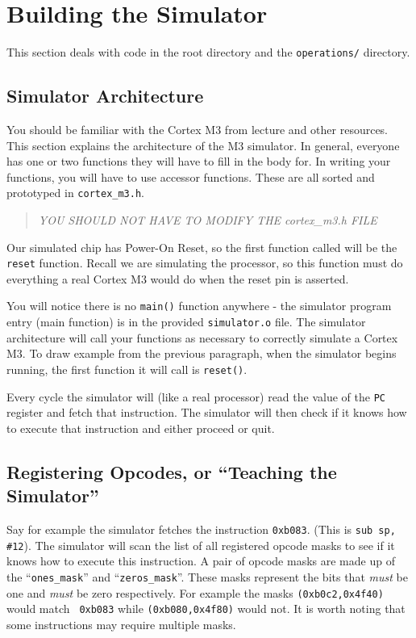 \documentclass{article}
\begin{document}
\section{Building the Simulator}

This section deals with code in the root directory and the {\tt operations/}
directory.

\subsection{Simulator Architecture}

You should be familiar with the Cortex M3 from lecture and other resources.
This section explains the architecture of the M3 simulator. In general,
everyone has one or two functions they will have to fill in the body for. In
writing your functions, you will have to use accessor functions. These are all
sorted and prototyped in {\tt cortex\_m3.h}.

\begin{quote}
  \emph{YOU SHOULD NOT HAVE TO MODIFY THE cortex\_m3.h FILE}
\end{quote}

Our simulated chip has Power-On Reset, so the first function called will be
the {\tt reset} function. Recall we are simulating the processor, so this
function must do everything a real Cortex M3 would do when the reset pin is
asserted.

You will notice there is no {\tt main()} function anywhere - the simulator
program entry (main function) is in the provided {\tt simulator.o} file. The
simulator architecture will call your functions as necessary to correctly
simulate a Cortex M3. To draw example from the previous paragraph, when the
simulator begins running, the first function it will call is {\tt reset()}.

Every cycle the simulator will (like a real processor) read the value of the
{\tt PC} register and fetch that instruction. The simulator will then check if
it knows how to execute that instruction and either proceed or quit.

\subsection{Registering Opcodes, or ``Teaching the Simulator''}

Say for example the simulator fetches the instruction {\tt 0xb083}. (This is
{\tt sub sp, \#12}). The simulator will scan the list of all registered opcode
masks to see if it knows how to execute this instruction. A pair of opcode
masks are made up of the ``{\tt ones\_mask}'' and ``{\tt zeros\_mask}''. These
masks represent the bits that {\em must} be one and {\em must} be zero
respectively. For example the masks {\tt (0xb0c2,0x4f40)} would match {\tt
0xb083} while {\tt (0xb080,0x4f80)} would not. It is worth noting that some
instructions may require multiple masks.
\end{document}
